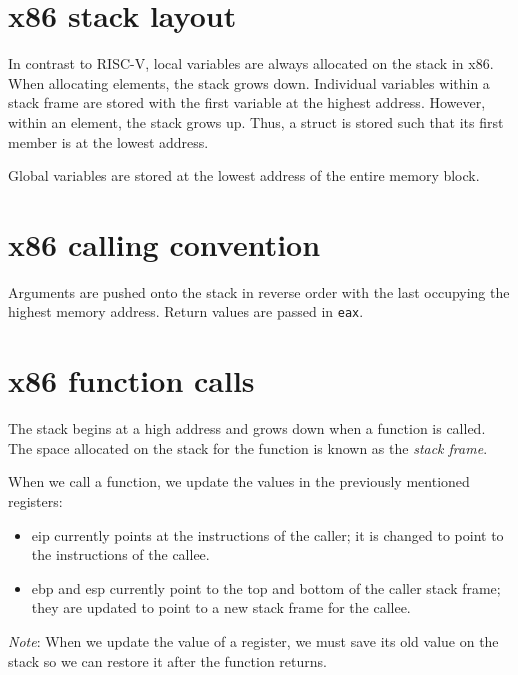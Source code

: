 \section{x86 stack layout}
In contrast to RISC-V, local variables are always allocated on the stack in x86. When allocating elements, the stack grows down. Individual variables within a stack frame are stored with the first variable at the highest address. However, within an element, the stack grows up. Thus, a struct is stored such that its first member is at the lowest address. 

Global variables are stored at the lowest address of the entire memory block.
\section{x86 calling convention}
Arguments are pushed onto the stack in reverse order with the last occupying the highest memory address. Return values are passed in \texttt{eax}.

\section{x86 function calls}
The stack begins at a high address and grows down when a function is called. The space allocated on the stack for the function is known as the \emph{stack frame}.

When we call a function, we update the values in the previously mentioned registers:
\begin{itemize}
    \item eip currently points at the instructions of the caller; it is changed to point to the instructions of the callee.
    \item ebp and esp currently point to the top and bottom of the caller stack frame; they are updated to point to a new stack frame for the callee.
\end{itemize}

\emph{Note}: When we update the value of a register, we must save its old value on the stack so we can restore it after the function returns.

